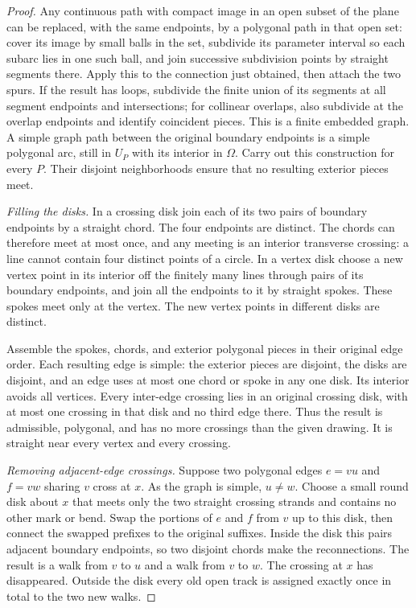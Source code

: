 \begin{proof}
Any continuous path with compact image in an open subset of the plane
can be replaced, with the same endpoints, by a polygonal path in that
open set: cover its image by small balls in the set, subdivide its
parameter interval so each subarc lies in one such ball, and join
successive subdivision points by straight segments there.  Apply this
to the connection just obtained, then attach the two spurs.  If the
result has loops, subdivide the finite union of its segments at all
segment endpoints and intersections; for collinear overlaps, also
subdivide at the overlap endpoints and identify coincident pieces.
This is a finite embedded graph.  A simple graph path between the
original boundary endpoints is a simple polygonal arc, still in
$U_P$ with its interior in $\Omega$.  Carry out this construction for
every $P$.  Their disjoint neighborhoods ensure that no resulting
exterior pieces meet.

\emph{Filling the disks.}
In a crossing disk join each of its two pairs of boundary endpoints
by a straight chord.  The four endpoints are distinct.  The chords
can therefore meet at most once, and any meeting is an interior
transverse crossing: a line cannot contain four distinct points of a
circle.  In a vertex disk choose a new vertex point in its interior
off the finitely many lines through pairs of its boundary endpoints,
and join all the endpoints to it by straight spokes.  These spokes
meet only at the vertex.  The new vertex points in different disks
are distinct.

Assemble the spokes, chords, and exterior polygonal pieces in their
original edge order.  Each resulting edge is simple: the exterior
pieces are disjoint, the disks are disjoint, and an edge uses at most
one chord or spoke in any one disk.  Its interior avoids all vertices.
Every inter-edge crossing lies in an original crossing disk, with at
most one crossing in that disk and no third edge there.  Thus the
result is admissible, polygonal, and has no more crossings than the
given drawing.  It is straight near every vertex and every crossing.

\emph{Removing adjacent-edge crossings.}
Suppose two polygonal edges $e=vu$ and $f=vw$ sharing $v$ cross at
$x$.  As the graph is simple, $u\ne w$.  Choose a small round disk
about $x$ that meets only the two straight crossing strands and
contains no other mark or bend.  Swap the portions of $e$ and $f$
from $v$ up to this disk, then connect the swapped prefixes to the
original suffixes.  Inside the disk this pairs adjacent boundary
endpoints, so two disjoint chords make the reconnections.  The result
is a walk from $v$ to $u$ and a walk from $v$ to $w$.  The crossing
at $x$ has disappeared.  Outside the disk every old open track is
assigned exactly once in total to the two new walks.


\end{proof}
